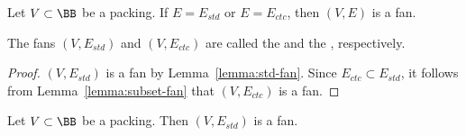 \begin{lemma}[]\label{lemma:ctc-fan}
Let $V\subset \BB$ be a packing.  If $E=E_{std}$ or $E=E_{ctc}$, then
$(V,E)$ is a fan.
\end{lemma}

\begin{definition}
The fans $(V,E_{std})$ and $(V,E_{ctc})$ are called the  and
the , respectively.  
\end{definition}
%
%
%
%
%
%
%

\begin{proof} 
  $(V,E_{std})$ is a fan by Lemma~\ref{lemma:std-fan}.  Since
  $E_{ctc}\subset E_{std}$, it follows from
  Lemma~\ref{lemma:subset-fan} that $(V,E_{ctc})$ is a fan.
\end{proof}


\begin{lemma}\label{lemma:std-fan} 
Let $V\subset \BB$ be a packing.  
Then $(V,E_{std})$ is a fan.
\end{lemma}
%

